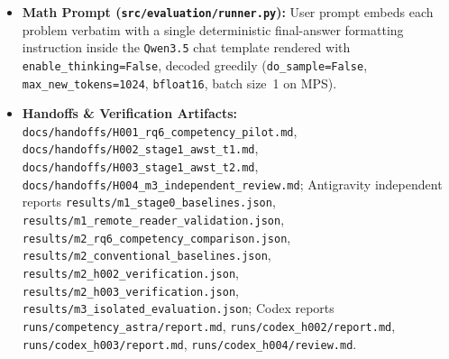 \documentclass[11pt]{article}
\newcommand{\codepath}[1]{\texttt{\nolinkurl{#1}}}
\begin{document}
\begin{itemize}
\item \textbf{Math Prompt (\codepath{src/evaluation/runner.py}):} User prompt embeds each problem verbatim with a single deterministic final-answer formatting instruction inside the \texttt{Qwen3.5} chat template rendered with \texttt{enable\_thinking=False}, decoded greedily (\texttt{do\_sample=False}, \texttt{max\_new\_tokens=1024}, \texttt{bfloat16}, batch size~1 on MPS).
\item \textbf{Handoffs \& Verification Artifacts:}
  \codepath{docs/handoffs/H001_rq6_competency_pilot.md},
  \codepath{docs/handoffs/H002_stage1_awst_t1.md},
  \codepath{docs/handoffs/H003_stage1_awst_t2.md},
  \codepath{docs/handoffs/H004_m3_independent_review.md};
  Antigravity independent reports
  \codepath{results/m1_stage0_baselines.json},
  \codepath{results/m1_remote_reader_validation.json},
  \codepath{results/m2_rq6_competency_comparison.json},
  \codepath{results/m2_conventional_baselines.json},
  \codepath{results/m2_h002_verification.json},
  \codepath{results/m2_h003_verification.json},
  \codepath{results/m3_isolated_evaluation.json};
  Codex reports
  \codepath{runs/competency_astra/report.md},
  \codepath{runs/codex_h002/report.md},
  \codepath{runs/codex_h003/report.md},
  \codepath{runs/codex_h004/review.md}.
\end{itemize}
\end{document}
